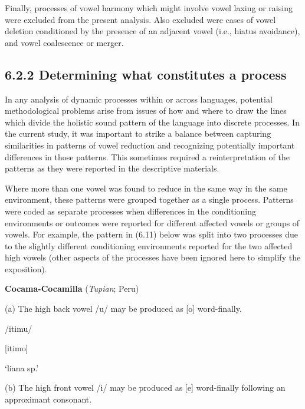   Finally, processes of vowel harmony which might involve vowel laxing or raising were excluded from the present analysis. Also excluded were cases of vowel deletion conditioned by the presence of an adjacent vowel (i.e., hiatus avoidance), and vowel coalescence or merger.


\subsection{6.2.2 Determining what constitutes a process}

  In any analysis of dynamic processes within or across languages, potential methodological problems arise from issues of how and where to draw the lines which divide the holistic sound pattern of the language into discrete processes. In the current study, it was important to strike a balance between capturing similarities in patterns of vowel reduction and recognizing potentially important differences in those patterns. This sometimes required a reinterpretation of the patterns as they were reported in the descriptive materials.



  Where more than one vowel was found to reduce in the same way in the same environment, these patterns were grouped together as a single process. Patterns were coded as separate processes when differences in the conditioning environments or outcomes were reported for different affected vowels or groups of vowels. For example, the pattern in (6.11) below was split into two processes due to the slightly different conditioning environments reported for the two affected high vowels (other aspects of the processes have been ignored here to simplify the exposition).



\ea\label{ex:(6.11)}
   \textbf{Cocama-Cocamilla} (\textit{Tupian}; Peru)



(a)  The high back vowel /u/ may be produced as [o] word-finally.



/itimu/



[itimo]



‘liana sp.’



(b)   The high front vowel /i/ may be produced as [e] word-finally following an approximant consonant.



